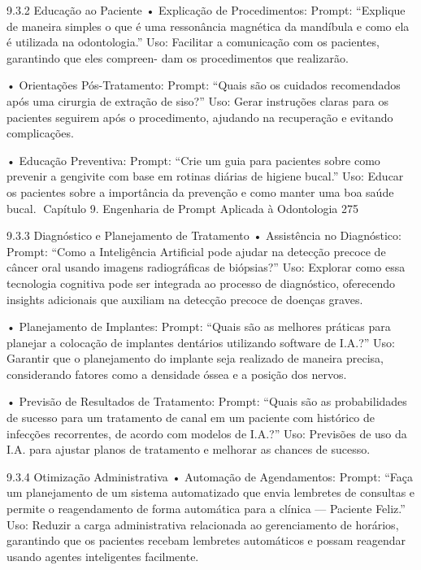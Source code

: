 9.3.2    Educação ao Paciente
    • Explicação de Procedimentos:
      Prompt: “Explique de maneira simples o que é uma ressonância magnética da
      mandíbula e como ela é utilizada na odontologia.”
      Uso: Facilitar a comunicação com os pacientes, garantindo que eles compreen-
      dam os procedimentos que realizarão.

    • Orientações Pós-Tratamento:
      Prompt: “Quais são os cuidados recomendados após uma cirurgia de extração
      de siso?”
      Uso: Gerar instruções claras para os pacientes seguirem após o procedimento,
      ajudando na recuperação e evitando complicações.

    • Educação Preventiva:
      Prompt: “Crie um guia para pacientes sobre como prevenir a gengivite com base
      em rotinas diárias de higiene bucal.”
      Uso: Educar os pacientes sobre a importância da prevenção e como manter uma
      boa saúde bucal.
Capítulo 9. Engenharia de Prompt Aplicada à Odontologia                            275


9.3.3    Diagnóstico e Planejamento de Tratamento
    • Assistência no Diagnóstico:
      Prompt: “Como a Inteligência Artificial pode ajudar na detecção precoce de câncer
      oral usando imagens radiográficas de biópsias?”
      Uso: Explorar como essa tecnologia cognitiva pode ser integrada ao processo de
      diagnóstico, oferecendo insights adicionais que auxiliam na detecção precoce de
      doenças graves.

    • Planejamento de Implantes:
      Prompt: “Quais são as melhores práticas para planejar a colocação de implantes
      dentários utilizando software de I.A.?”
      Uso: Garantir que o planejamento do implante seja realizado de maneira precisa,
      considerando fatores como a densidade óssea e a posição dos nervos.

    • Previsão de Resultados de Tratamento:
      Prompt: “Quais são as probabilidades de sucesso para um tratamento de canal
      em um paciente com histórico de infecções recorrentes, de acordo com modelos
      de I.A.?”
      Uso: Previsões de uso da I.A. para ajustar planos de tratamento e melhorar as
      chances de sucesso.

9.3.4    Otimização Administrativa
    • Automação de Agendamentos:
      Prompt: “Faça um planejamento de um sistema automatizado que envia lembretes
      de consultas e permite o reagendamento de forma automática para a clínica —
      Paciente Feliz.”
      Uso: Reduzir a carga administrativa relacionada ao gerenciamento de horários,
      garantindo que os pacientes recebam lembretes automáticos e possam reagendar
      usando agentes inteligentes facilmente.

